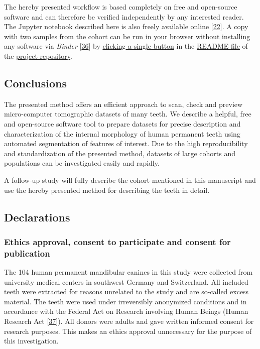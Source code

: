 \documentclass[
  american,
]{article}
\begin{document}
The hereby presented workflow is based completely on free and open-source software and can therefore be verified independently by any interested reader.
The Jupyter notebook described here is also freely available online {[}\protect\hyperlink{ref-tZRGGuMm}{22}{]}.
A copy with two samples from the cohort can be run in your browser without installing any software via \emph{Binder} {[}\protect\hyperlink{ref-Q20Bxdsr}{36}{]} by \href{https://mybinder.org/v2/gh/habi/zmk-tooth-cohort/master?filepath=ToothAnalysis.ipynb}{clicking a single button} in the \href{https://github.com/habi/zmk-tooth-cohort/blob/master/README.md}{README file} of the \href{https://github.com/habi/zmk-tooth-cohort/}{project repository}.

\hypertarget{conclusions}{%
\subsection{Conclusions}\label{conclusions}}

The presented method offers an efficient approach to scan, check and preview micro-computer tomographic datasets of many teeth.
We describe a helpful, free and open-source software tool to prepare datasets for precise description and characterization of the internal morphology of human permanent teeth using automated segmentation of features of interest.
Due to the high reproducibility and standardization of the presented method, datasets of large cohorts and populations can be investigated easily and rapidly.

A follow-up study will fully describe the cohort mentioned in this manuscript and use the hereby presented method for describing the teeth in detail.

\hypertarget{declarations}{%
\subsection{Declarations}\label{declarations}}

\hypertarget{ethics-approval-consent-to-participate-and-consent-for-publication}{%
\subsubsection{Ethics approval, consent to participate and consent for publication}\label{ethics-approval-consent-to-participate-and-consent-for-publication}}

The 104 human permanent mandibular canines in this study were collected from university medical centers in southwest Germany and Switzerland.
All included teeth were extracted for reasons unrelated to the study and are so-called excess material.
The teeth were used under irreversibly anonymized conditions and in accordance with the Federal Act on Research involving Human Beings (Human Research Act {[}\protect\hyperlink{ref-10OKzEtEb}{37}{]}).
All donors were adults and gave written informed consent for research purposes.
This makes an ethics approval unnecessary for the purpose of this investigation.
\end{document}

